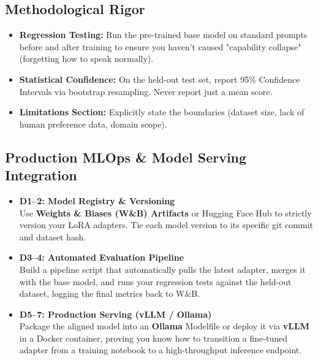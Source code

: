 \documentclass[11pt,a4paper]{article}
\begin{document}
\subsection*{Methodological Rigor}

\begin{tcolorbox}[methodbox={✅ Evaluation \& Statistical Honesty}]
\begin{itemize}[leftmargin=*]
    \item \textbf{Regression Testing:} Run the pre-trained base model on standard prompts before and after training to ensure you haven't caused "capability collapse" (forgetting how to speak normally).
    \item \textbf{Statistical Confidence:} On the held-out test set, report 95\% Confidence Intervals via bootstrap resampling. Never report just a mean score.
    \item \textbf{Limitations Section:} Explicitly state the boundaries (dataset size, lack of human preference data, domain scope).
\end{itemize}
\end{tcolorbox}

\subsection*{Production MLOps \& Model Serving Integration}

\begin{tcolorbox}[systembox={ Step-by-Step: Registry \& Inference Endpoint}]
\begin{itemize}[leftmargin=*]
    \item \textbf{D1–2: Model Registry \& Versioning}\\
          Use \textbf{Weights \& Biases (W\&B) Artifacts} or Hugging Face Hub to strictly version your LoRA adapters. Tie each model version to its specific git commit and dataset hash.
    \item \textbf{D3–4: Automated Evaluation Pipeline}\\
          Build a pipeline script that automatically pulls the latest adapter, merges it with the base model, and runs your regression tests against the held-out dataset, logging the final metrics back to W\&B.
    \item \textbf{D5–7: Production Serving (vLLM / Ollama)}\\
          Package the aligned model into an \textbf{Ollama} Modelfile or deploy it via \textbf{vLLM} in a Docker container, proving you know how to transition a fine-tuned adapter from a training notebook to a high-throughput inference endpoint.
\end{itemize}
\end{tcolorbox}
\end{document}
